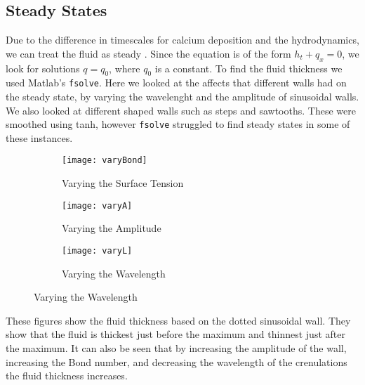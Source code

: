 \documentclass[12pt]{article}
\begin{document}
 \subsection{Steady States}
 Due to the difference in timescales for calcium deposition and the hydrodynamics, we can treat the fluid as steady \cite{short,PhysRevLett.108.238501}. Since the equation is of the form $h_t + q_x = 0 $, we look for solutions $q = q_0$, where $q_0$ is a constant. To find the fluid thickness we used Matlab's \texttt{fsolve}. Here we looked at the affects that different walls had on the steady state, by varying the wavelenght and the amplitude of sinusoidal walls. We also looked at different shaped walls such as steps and sawtooths. These were smoothed using tanh, however \texttt{fsolve} struggled to find steady states in some of these instances. 
\begin{figure}[H]
	\caption{Example fluid thicknesses with a sinusoidal wall}	\begin{subfigure}{.33\linewidth}
	\centering
	\caption{Varying  the Surface Tension}
	\texttt{[image: varyBond]}
\end{subfigure}	\begin{subfigure}{.33\linewidth}
	\centering
	\caption{Varying the Amplitude}
	\texttt{[image: varyA]}
\end{subfigure}\begin{subfigure}{.33\linewidth}
	\centering
	\caption{Varying the Wavelength}
	\texttt{[image: varyL]}
\end{subfigure}\end{figure}
These figures show the fluid thickness based on the dotted sinusoidal wall.  They show that the fluid is thickest just before the maximum and thinnest just after the maximum. It can also be seen that by increasing the amplitude of the wall, increasing the Bond number, and decreasing the wavelength of the crenulations the fluid thickness increases.
\end{document}
